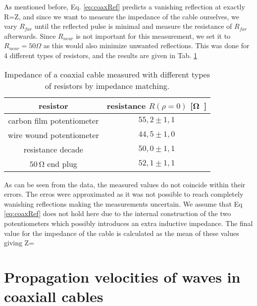 \documentclass[a4paper,10pt,twocolumn]{article}
\begin{document}
    As mentioned before, Eq. \ref{eq:coaxRef} predicts a vanishing reflection at exactly R=Z, and since we want to measure the impedance of the cable ourselves, we vary $R_{far}$ until the reflected pulse is minimal and measure the resistance of $R_{far}$ afterwards.
    Since $R_{near}$ is not important for this measurement, we set it to $R_{near}=50\Omega $ as this would also minimize unwanted reflections.
    This was done for 4 different types of resistors, and the results are given in Tab. \ref{tab:impedance}
    \begin{table}[htbp]          %
        \centering
        \begin{tabular*}{\linewidth}{@{\extracolsep{\fill}}cc}
            \hline
            \hline
            \rule[-7pt]{0pt}{23pt}  resistor  &  resistance $R(\rho=0)$ [\si\ohm]  	 \\
            \hline
            \rule[-5pt]{0pt}{23pt}   carbon film potentiometer   &   $55,2 \pm 1,1$  	 \\
            \rule[-5pt]{0pt}{23pt}   wire wound potentiometer   &   $44,5 \pm 1,0$  	 \\
            \rule[-5pt]{0pt}{23pt}   resistance decade   &   $50,0 \pm 1,1$  	 \\
            \rule[-5pt]{0pt}{23pt}   $50\,\si\ohm$ end plug   &   $52,1 \pm 1,1$  	 \\
            \hline
            \hline
        \end{tabular*}
        \normalsize
        \caption[]{Impedance of a coaxial cable measured with different types of resistors by impedance matching.}  %
        \label{tab:impedance}                             %
    \end{table}
    As can be seen from the data, the measured values do not coincide within their errors. The erros were approximated as it was not possible to reach completely wanishing reflections making the measurements uncertain.
    We assume that Eq \ref{eq:coaxRef} does not hold here due to the internal construction of the two potentiometers which possibly introduces an extra inductive impedance.
    The final value for the impedance of the cable is calculated as the mean of these values giving Z=
    \section{Propagation velocities of waves in coaxiall cables}
\end{document}
